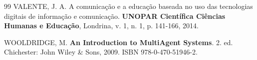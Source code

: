 \documentclass[12pt,a4paper]{article}
\begin{document}
\begin{thebibliography}{99}
 VALENTE, J. A. A comunicação e a educação baseada no uso das tecnologias digitais de informação e comunicação. \textbf{UNOPAR Científica Ciências Humanas e Educação}, Londrina, v. 1, n. 1, p. 141-166, 2014.

 WOOLDRIDGE, M. \textbf{An Introduction to MultiAgent Systems}. 2. ed. Chichester: John Wiley \& Sons, 2009. ISBN 978-0-470-51946-2.

\end{thebibliography}
\end{document}
